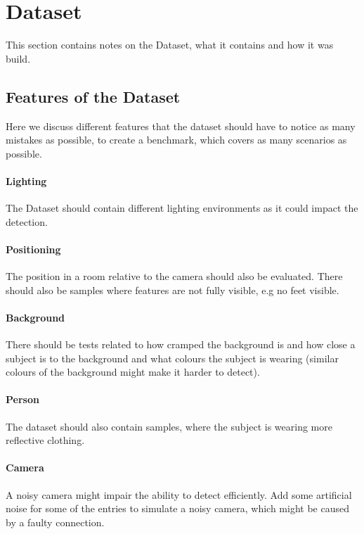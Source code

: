 \section{Dataset}

This section contains notes on the Dataset, what it contains and how it was build.

\subsection{Features of the Dataset}

Here we discuss different features that the dataset should have to notice as many mistakes as possible, to create a benchmark, which covers as many scenarios as possible.

\paragraph{Lighting} The Dataset should contain different lighting environments as it could impact the detection.

\paragraph{Positioning} The position in a room relative to the camera should also be evaluated. There should also be samples where features are not fully visible, e.g no feet visible.

\paragraph{Background} There should be tests related to how cramped the background is and how close a subject is to the background and what colours the subject is wearing (similar colours of the background might make it harder to detect).

\paragraph{Person} The dataset should also contain samples, where the subject is wearing more reflective clothing.

\paragraph{Camera} A noisy camera might impair the ability to detect efficiently. Add some artificial noise for some of the entries to simulate a noisy camera, which might be caused by a faulty connection.

